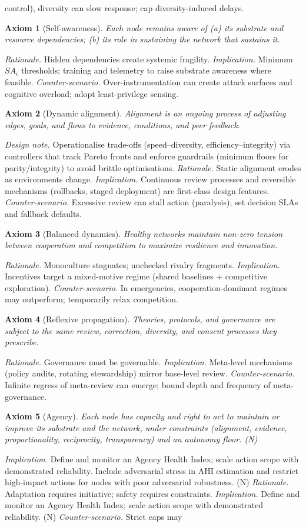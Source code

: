 \documentclass[12pt]{article}
\newtheorem{axiom}{Axiom}
\begin{document}
control), diversity can slow response; cap diversity-induced delays. \begin{axiom}[Self-awareness] Each node remains aware of (a) its substrate and resource dependencies; (b) its role in sustaining the network that sustains it. \end{axiom} \emph{Rationale.} Hidden dependencies create systemic fragility. \emph{Implication.} Minimum $SA_i$ thresholds; training and telemetry to raise substrate awareness where feasible. \emph{Counter-scenario.} Over-instrumentation can create attack surfaces and cognitive overload; adopt least-privilege sensing. \begin{axiom}[Dynamic alignment] Alignment is an ongoing process of adjusting edges, goals, and flows to evidence, conditions, and peer feedback. \end{axiom} \emph{Design note.} Operationalise trade-offs (speed--diversity, efficiency--integrity) via controllers that track Pareto fronts and enforce guardrails (minimum floors for parity/integrity) to avoid brittle optimisations. \emph{Rationale.} Static alignment erodes as environments change. \emph{Implication.} Continuous review processes and reversible mechanisms (rollbacks, staged deployment) are first-class design features. \emph{Counter-scenario.} Excessive review can stall action (paralysis); set decision SLAs and fallback defaults. \begin{axiom}[Balanced dynamics] Healthy networks maintain non-zero tension between cooperation and competition to maximize resilience and innovation. \end{axiom} \emph{Rationale.} Monoculture stagnates; unchecked rivalry fragments. \emph{Implication.} Incentives target a mixed-motive regime (shared baselines + competitive exploration). \emph{Counter-scenario.} In emergencies, cooperation-dominant regimes may outperform; temporarily relax competition. \begin{axiom}[Reflexive propagation] Theories, protocols, and governance are subject to the same review, correction, diversity, and consent processes they prescribe. \end{axiom} \emph{Rationale.} Governance must be governable. \emph{Implication.} Meta-level mechanisms (policy audits, rotating stewardship) mirror base-level review. \emph{Counter-scenario.} Infinite regress of meta-review can emerge; bound depth and frequency of meta-governance. \begin{axiom}[Agency] Each node has capacity and right to act to maintain or improve its substrate and the network, under constraints (alignment, evidence, proportionality, reciprocity, transparency) and an autonomy floor. (N) \end{axiom} \emph{Implication.} Define and monitor an Agency Health Index; scale action scope with demonstrated reliability. Include adversarial stress in AHI estimation and restrict high-impact actions for nodes with poor adversarial robustness. (N) \emph{Rationale.} Adaptation requires initiative; safety requires constraints. \emph{Implication.} Define and monitor an Agency Health Index; scale action scope with demonstrated reliability. (N) \emph{Counter-scenario.} Strict caps may 
\end{document}
